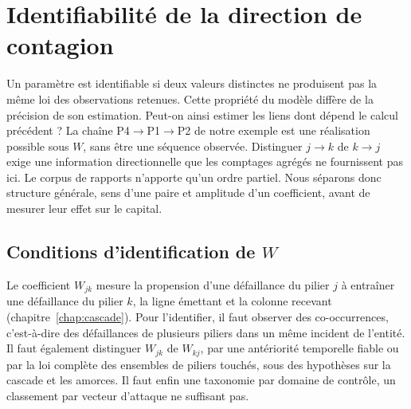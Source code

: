 ﻿%

\chapter{Identifiabilité de la direction de contagion}
\label{ch:identifiabilite}

Un paramètre est identifiable si deux valeurs distinctes ne produisent pas la même loi des observations retenues. Cette propriété du modèle diffère de la précision de son estimation. Peut-on ainsi estimer les liens dont dépend le calcul précédent ? La chaîne P4$\to$P1$\to$P2 de notre
exemple est une réalisation possible sous $W$, sans être une séquence observée. Distinguer
$j\to k$ de $k\to j$ exige une information directionnelle que les comptages agrégés ne fournissent
pas ici. Le corpus de rapports n'apporte qu'un ordre partiel. Nous séparons donc structure
générale, sens d'une paire et amplitude d'un coefficient, avant de mesurer leur effet sur le capital.

\section{Conditions d'identification de $W$}

Le coefficient $W_{jk}$ mesure la propension d'une défaillance du pilier $j$ à entraîner une
défaillance du pilier $k$, la ligne émettant et la colonne recevant (chapitre~\ref{chap:cascade}).
Pour l'identifier, il faut observer des co-occurrences, c'est-à-dire des défaillances de plusieurs piliers dans un même incident de l'entité. Il faut également distinguer $W_{jk}$ de $W_{kj}$, par une antériorité temporelle fiable ou par la loi complète des ensembles de piliers touchés, sous des hypothèses sur la cascade et les amorces. Il faut enfin
une taxonomie par domaine de contrôle, un classement par vecteur d'attaque ne suffisant pas.

